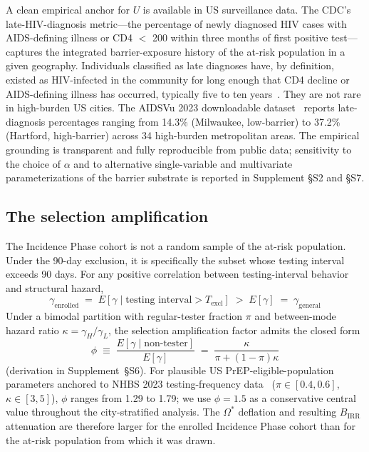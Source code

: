 \documentclass[11pt]{article}
\begin{document}
A clean empirical anchor for $U$ is available in US surveillance data. The CDC's late-HIV-diagnosis metric---the percentage of newly diagnosed HIV cases with AIDS-defining illness or CD4 $<$ 200 within three months of first positive test---captures the integrated barrier-exposure history of the at-risk population in a given geography. Individuals classified as late diagnoses have, by definition, existed as HIV-infected in the community for long enough that CD4 decline or AIDS-defining illness has occurred, typically five to ten years~\cite{cdcatp2023}. They are not rare in high-burden US cities. The AIDSVu 2023 downloadable dataset~\cite{aidsvu2023} reports late-diagnosis percentages ranging from 14.3\% (Milwaukee, low-barrier) to 37.2\% (Hartford, high-barrier) across 34 high-burden metropolitan areas. The empirical grounding is transparent and fully reproducible from public data; sensitivity to the choice of $\alpha$ and to alternative single-variable and multivariate parameterizations of the barrier substrate is reported in Supplement \S S2 and \S S7.

\subsection{The selection amplification}

The Incidence Phase cohort is not a random sample of the at-risk population. Under the 90-day exclusion, it is specifically the subset whose testing interval exceeds 90 days. For any positive correlation between testing-interval behavior and structural hazard,
\begin{equation}
\gamma_{\mathrm{enrolled}} \;=\; E[\gamma \mid \text{testing interval} > T_{\mathrm{excl}}] \;>\; E[\gamma] \;=\; \gamma_{\mathrm{general}} \label{eq:selection}
\end{equation}
Under a bimodal partition with regular-tester fraction $\pi$ and between-mode hazard ratio $\kappa = \gamma_H / \gamma_L$, the selection amplification factor admits the closed form
\begin{equation}
\phi \;\equiv\; \frac{E[\gamma \mid \text{non-tester}]}{E[\gamma]} \;=\; \frac{\kappa}{\pi + (1-\pi)\kappa} \label{eq:phi}
\end{equation}
(derivation in Supplement~\S S6). For plausible US PrEP-eligible-population parameters anchored to NHBS 2023 testing-frequency data~\cite{nhbs2023} ($\pi \in [0.4, 0.6]$, $\kappa \in [3, 5]$), $\phi$ ranges from 1.29 to 1.79; we use $\phi = 1.5$ as a conservative central value throughout the city-stratified analysis. The $\Omega^*$ deflation and resulting $B_{\mathrm{IRR}}$ attenuation are therefore larger for the enrolled Incidence Phase cohort than for the at-risk population from which it was drawn.
\end{document}

